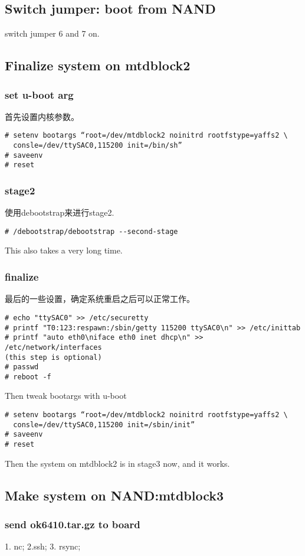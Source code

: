 \documentclass[11pt,a4paper]{article}
\begin{document}
\begin{CJK}{UTF8}{gbsn}
\subsection{Switch jumper: boot from NAND}
switch jumper 6 and 7 on.

\subsection{Finalize system on mtdblock2}
\subsubsection{set u-boot arg}
首先设置内核参数。
\begin{verbatim}
# setenv bootargs “root=/dev/mtdblock2 noinitrd rootfstype=yaffs2 \
  consle=/dev/ttySAC0,115200 init=/bin/sh”
# saveenv
# reset
\end{verbatim}
\subsubsection{stage2}
使用debootstrap来进行stage2.
\begin{verbatim}
# /debootstrap/debootstrap --second-stage
\end{verbatim}
This also takes a very long time.
\subsubsection{finalize}
最后的一些设置，确定系统重启之后可以正常工作。
\begin{verbatim}
# echo "ttySAC0" >> /etc/securetty
# printf "T0:123:respawn:/sbin/getty 115200 ttySAC0\n" >> /etc/inittab
# printf "auto eth0\niface eth0 inet dhcp\n" >> /etc/network/interfaces 
(this step is optional)
# passwd
# reboot -f
\end{verbatim}
Then tweak bootargs with u-boot
\begin{verbatim}
# setenv bootargs “root=/dev/mtdblock2 noinitrd rootfstype=yaffs2 \
  consle=/dev/ttySAC0,115200 init=/sbin/init”
# saveenv
# reset
\end{verbatim}
Then the system on mtdblock2 is in stage3 now, and it works.

\subsection{Make system on NAND:mtdblock3}
\subsubsection{send ok6410.tar.gz to board}
1. nc; 2.ssh; 3. rsync;

\end{CJK}
\end{document}
